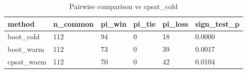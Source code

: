 \begin{table}[t]
\centering
\begin{tabular}{llllll}
\toprule
method & n\_common & pi\_win & pi\_tie & pi\_loss & sign\_test\_p \\
\midrule
boot\_cold & 112 & 94 & 0 & 18 & 0.0000 \\
boot\_warm & 112 & 73 & 0 & 39 & 0.0017 \\
cpsat\_warm & 112 & 70 & 0 & 42 & 0.0104 \\
\bottomrule
\end{tabular}
\caption{Pairwise comparison vs cpsat_cold}
\label{tab:ablation}
\end{table}
